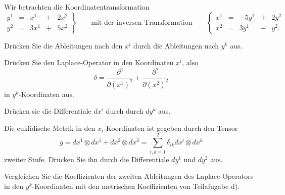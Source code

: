 Wir betrachten die Koordinatentransformation
\[
\renewcommand{\arraycolsep}{2pt}
\left.
\begin{array}{rcrcr}
y^1 &=&  x^1 &+& 2x^2 \\
y^2 &=& 3x^1 &+& 5x^2
\end{array}
\right\}
\qquad\text{mit der inversen Transformation}\qquad
\left\{
\begin{array}{rcrcr}
x^1 &=& -5y^1 &+& 2y^2\phantom{.} \\
x^2 &=&  3y^1 &-&  y^2.
\end{array}
\right.
\]
\begin{teilaufgaben}
\item
Drücken Sie die Ableitungen nach den $x^i$ durch die Ableitungen nach
$y^k$ aus.
\item
Drücken Sie den Laplace-Operator in den Koordinaten $x^i$, also 
\[
\delta =
\frac{\partial^2}{\partial (x^1)^2}
+
\frac{\partial^2}{\partial (x^2)^2}
\]
in $y^k$-Koordinaten aus.
\item
Drücken sie die Differentiale $dx^i$ durch durch $dy^k$ aus.
\item
Die euklidische Metrik in den $x_i$-Koordinaten ist gegeben durch
den Tensor
\[
g
=
dx^1\otimes dx^1
+
dx^2\otimes dx^2
=
\sum_{i,k=1}^2
\delta_{ik}dx^i\otimes dx^k
\]
zweiter Stufe.
Drücken Sie ihn durch die Differentiale $dy^1$ und $dy^2$ aus.
\item
Vergleichen Sie die Koeffizienten der zweiten Ableitungen des
Laplace-Operators in den $y^k$-Koordinaten mit den metrischen
Koeffizienten von Teilafugabe d).
\end{teilaufgaben}

